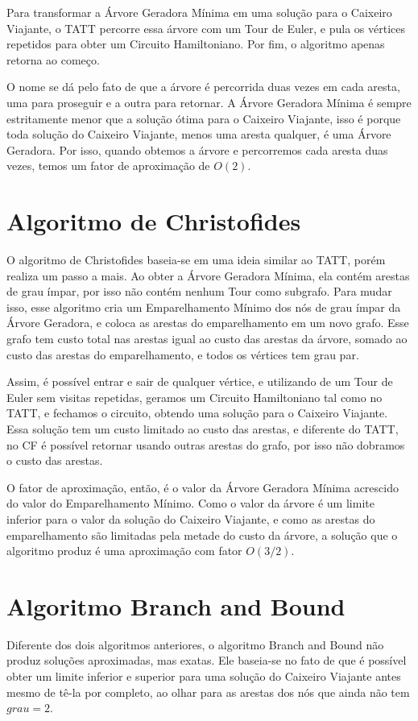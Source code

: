 \documentclass[12pt]{article}
\begin{document}
Para transformar a Árvore Geradora Mínima em uma solução para o Caixeiro Viajante,
o TATT percorre essa árvore com um Tour de Euler, e pula os vértices repetidos
para obter um Circuito Hamiltoniano. Por fim, o algoritmo apenas retorna ao começo.

O nome se dá pelo fato de que a árvore é percorrida duas vezes em cada aresta,
uma para proseguir e a outra para retornar. A Árvore Geradora Mínima é sempre
estritamente menor que a solução ótima para o Caixeiro Viajante, isso é porque
toda solução do Caixeiro Viajante, menos uma aresta qualquer, é uma Árvore Geradora.
Por isso, quando obtemos a árvore e percorremos cada aresta duas vezes, temos
um fator de aproximação de $O(2)$.

\section{Algoritmo de Christofides}
O algoritmo de Christofides \cite{christofides1976worst} baseia-se em uma ideia similar ao TATT, porém realiza
um passo a mais. Ao obter a Árvore Geradora Mínima, ela contém arestas de grau
ímpar, por isso não contém nenhum Tour como subgrafo. Para mudar isso, esse
algoritmo cria um Emparelhamento Mínimo dos nós de grau ímpar da Árvore Geradora,
e coloca as arestas do emparelhamento em um novo grafo. Esse grafo tem custo total
nas arestas igual ao custo das arestas da árvore, somado ao custo das arestas do
emparelhamento, e todos os vértices tem grau par.

Assim, é possível entrar e sair de qualquer vértice, e utilizando de um Tour
de Euler sem visitas repetidas, geramos um Circuito Hamiltoniano tal como no
TATT, e fechamos o circuito, obtendo uma solução para o Caixeiro Viajante.
Essa solução tem um custo limitado ao custo das arestas, e diferente do TATT,
no CF é possível retornar usando outras arestas do grafo, por isso
não dobramos o custo das arestas.

O fator de aproximação, então, é o valor da Árvore Geradora Mínima acrescido
do valor do Emparelhamento Mínimo. Como o valor da árvore é um limite inferior
para o valor da solução do Caixeiro Viajante, e como as arestas do
emparelhamento são limitadas pela metade do custo da árvore, a solução que o
algoritmo produz é uma aproximação com fator $O(3/2)$.

\section{Algoritmo Branch and Bound}
Diferente dos dois algoritmos anteriores, o algoritmo Branch and Bound não
produz soluções aproximadas, mas exatas. Ele baseia-se no fato de que é possível
obter um limite inferior e superior para uma solução do Caixeiro Viajante antes
mesmo de tê-la por completo, ao olhar para as arestas dos nós que ainda não tem
$grau=2$.
\end{document}
